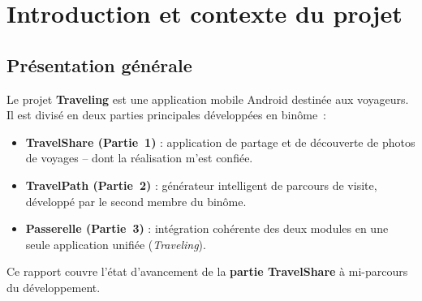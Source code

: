 \documentclass[12pt, a4paper, openany]{report}
\begin{document}
\begin{titlepage}
\begin{center}
\end{center}

\vfill


\restoregeometry
\end{titlepage}

\tableofcontents
\newpage

\chapter{Introduction et contexte du projet}

\section{Présentation générale}

Le projet \textbf{Traveling} est une application mobile Android destinée aux voyageurs. Il est
divisé en deux parties principales développées en binôme~:

\begin{itemize}
  \item \textbf{TravelShare (Partie~1)} : application de partage et de découverte de photos
        de voyages -- dont la réalisation m'est confiée.
  \item \textbf{TravelPath (Partie~2)} : générateur intelligent de parcours de visite,
        développé par le second membre du binôme.
  \item \textbf{Passerelle (Partie~3)} : intégration cohérente des deux modules en une
        seule application unifiée (\textit{Traveling}).
\end{itemize}

Ce rapport couvre l'état d'avancement de la \textbf{partie TravelShare} à mi-parcours du
développement.
\end{document}

